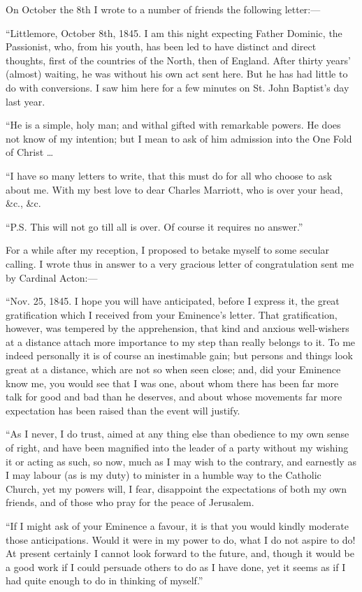 On October the 8th I wrote to a number of friends the
following letter:—

``Littlemore, October 8th, 1845. I am this night
expecting Father Dominic, the Passionist, who, from his youth, has been
led to have distinct and direct thoughts, first of the countries of the
North, then of England. After thirty years' (almost) waiting, he was
without his own act sent here. But he has had little to do with
conversions. I saw him here for a few minutes on St. John Baptist's day
last year.

``He is a simple, holy man; and withal gifted with
remarkable powers. He does not know of my intention; but I mean to
ask of him admission into the One Fold of Christ …

``I have so many letters to write, that this must do for
all who choose to ask about me. With my best love to dear Charles
Marriott, who is over your head, \&c., \&c.

``P.S. This will not go till all is over. Of course it requires
no answer.''

For a while after my reception, I proposed to betake myself to some
secular calling. I wrote thus in answer to a very gracious letter of
congratulation sent me by Cardinal Acton:—

``Nov. 25, 1845. I hope you will have anticipated, before I
express it, the great gratification which I received from your
Eminence's letter. That gratification, however, was tempered by the
apprehension, that kind and anxious well-wishers at a distance attach
more importance to my step than really belongs to it. To me indeed
personally it is of course an inestimable gain; but persons and things
look great at a distance, which are not so when seen close; and, did
your Eminence know me, you would see that I was one, about whom there
has been far more talk for good and bad than he deserves, and about
whose movements far more expectation has been raised than the event will
justify.

``As I never, I do trust, aimed at any thing else than obedience
to my own sense of right, and have been magnified into the leader of a
party without my wishing it or acting as such, so now, much as I may
wish to the contrary, and earnestly as I may labour (as is my duty) to
minister in a humble way to the Catholic Church, yet my powers will, I
fear, disappoint the expectations of both my own friends, and of those
who pray for the peace of Jerusalem.

``If I might ask of your Eminence a favour, it is that you would
kindly moderate those anticipations. Would it were in my power to do,
what I do not aspire to do! At present certainly I cannot look forward
to the future, and, though it would be a good work if I could persuade
others to do as I have done, yet it seems as if I had quite enough to do
in thinking of myself.''

